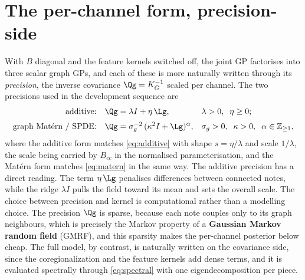 \section{The per-channel form, precision-side}
With $B$ diagonal and the feature kernels switched off, the joint GP
factorises into three scalar graph GPs, and each of these is more naturally
written through its \emph{precision}, the inverse covariance
$\Qg = K_G^{-1}$ scaled per channel. The two precisions used in the
development sequence are
\begin{align}
  \text{additive:} \quad & \Qg = \lambda I + \eta\, \Lg,
      && \lambda > 0,\;\; \eta \ge 0;
  \label{eq:additive-prec}\\[2pt]
  \text{graph Mat\'ern / SPDE:} \quad & \Qg = \sigma_g^{-2}\,(\kappa^2 I + \Lg)^{\alpha},
      && \sigma_g > 0,\;\; \kappa > 0,\;\; \alpha \in \mathbb{Z}_{\ge 1},
  \label{eq:matern-prec}
\end{align}
where the additive form matches \eqref{eq:additive} with shape
$s = \eta / \lambda$ and scale $1/\lambda$, the scale being carried by
$B_{cc}$ in the normalised parameterisation, and the Mat\'ern form matches
\eqref{eq:matern} in the same way. The additive precision has a direct
reading. The term $\eta\,\Lg$ penalises differences between connected notes,
while the ridge $\lambda I$ pulls the field toward its mean and sets the
overall scale. The choice between precision and kernel is computational
rather than a modelling choice. The precision $\Qg$ is sparse, because each
note couples only to its graph neighbours, which is precisely the Markov
property of a \textbf{Gaussian Markov random field} (GMRF), and this
sparsity makes the per-channel posterior below cheap. The full model, by
contrast, is naturally written on the covariance side, since the
coregionalization and the feature kernels add dense terms, and it is
evaluated spectrally through \eqref{eq:spectral} with one eigendecomposition
per piece.

